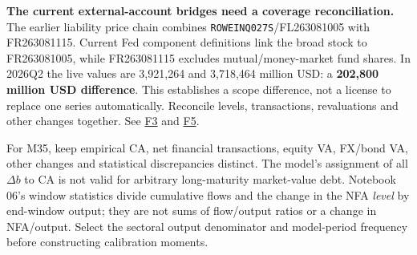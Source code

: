 \documentclass[10pt,a4paper,landscape]{article}
\newcommand{\code}[1]{{\footnotesize\texttt{#1}}}
\begin{document}
\textbf{The current external-account bridges need a coverage reconciliation.}
The earlier liability price chain combines \code{ROWEINQ027S}/FL263081005 with FR263081115. Current Fed component definitions link the broad stock to FR263081005, while FR263081115 excludes mutual/money-market fund shares. In 2026Q2 the live values are 3,921,264 and 3,718,464 million USD: a \textbf{202,800 million USD difference}. This establishes a scope difference, not a license to replace one series automatically. Reconcile levels, transactions, revaluations and other changes together. See \hyperlink{src-F3}{F3} and \hyperlink{src-F5}{F5}.

For M35, keep empirical CA, net financial transactions, equity VA, FX/bond VA, other changes and statistical discrepancies distinct. The model's assignment of all $\Delta b$ to CA is not valid for arbitrary long-maturity market-value debt. Notebook 06's window statistics divide cumulative flows and the change in the NFA \emph{level} by end-window output; they are not sums of flow/output ratios or a change in NFA/output. Select the sectoral output denominator and model-period frequency before constructing calibration moments.



\clearpage
\end{document}
